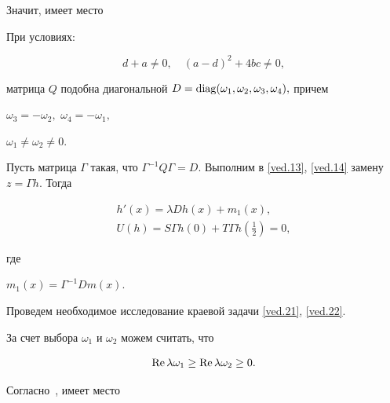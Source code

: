 Значит, имеет место 



\smallskip



\begin{lemma}[1]При условиях:

\begin{equation}

\label{ved.20}

  d+a\neq 0 ,\quad  (a-d)^2+4bc\neq 0, 

 \end{equation}

  матрица $Q$ подобна диагональной $D=\mathop{\rm diag}(\omega_1,\omega_2,\omega_3,\omega_4),$ причем 

  $\omega_3=-\omega_2,$ $\omega_4=-\omega_1,$

$\omega_1\neq\omega_2 \neq 0.$

  \end{lemma}

  

 \smallskip

  

Пусть матрица $\Gamma$ такая, что $\Gamma^{-1}Q\Gamma=D$. Выполним в \eqref{ved.13}, \eqref{ved.14} замену $z=\Gamma h$. Тогда 

   \begin{gather}

\label{ved.21}

  h'(x)=\lambda Dh(x)+m_1(x),

\\

\label{ved.22}

  U(h)=S\Gamma h(0)+T\Gamma h(\tfrac12)=0,

\end{gather}

 где

   $m_1(x)=\Gamma^{-1}Dm(x)$.



  

Проведем необходимое исследование краевой задачи \eqref{ved.21}, \eqref{ved.22}. 

За счет выбора $\omega_1$ и $\omega_2$ можем считать, что

$$

\mathop{\rm Re}\lambda\omega_1\geq \mathop{\rm Re}\lambda\omega_2\geq 0.

$$

Согласно~\cite{kor:bib:11}, имеет место



